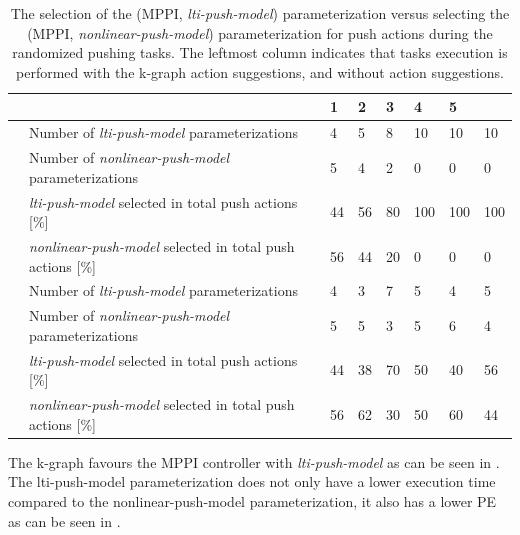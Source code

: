 \begin{table}[H]
    \caption{The selection of the (\ac{MPPI}, \textit{lti-push-model}) parameterization versus selecting the (\ac{MPPI}, \textit{nonlinear-push-model}) parameterization for push actions during the randomized pushing tasks. The leftmost column indicates that tasks execution is performed with the \ac{k-graph} action suggestions, and without action suggestions.}
    \label{table:rand_push_model1_vs_model2}
    \centering
    \begin{tabular}%
      {
        >{\raggedright\arraybackslash}p{}
        >{\raggedright\arraybackslash}p{}
      |p{0.4cm}p{0.4cm}p{0.4cm}p{0.4cm}p{0.4cm}p{0.4cm}}
      \multicolumn{2}{c|}{Number of Tasks in experience} &0&1&2&3&4&5\\\toprule
      \multirow{4}{0.1\textwidth}{With \ac{k-graph} suggestions} 
      &Number of \textit{lti-push-model} parameterizations&4&5&8&10&10&10\\
      &Number of \textit{nonlinear-push-model} parameterizations&5&4&2&0&0&0\\
      & \textit{lti-push-model} selected in total push actions [\%]&44&56&80&100&100&100\\
      & \textit{nonlinear-push-model} selected in total push actions [\%]&56&44&20&0&0&0\\\midrule
      \multirow{4}{0.1\textwidth}{Without \ac{k-graph} suggestions} 
      &Number of \textit{lti-push-model} parameterizations&4&3&7&5&4&5\\
      &Number of \textit{nonlinear-push-model} parameterizations&5&5&3&5&6&4\\
      & \textit{lti-push-model} selected in total push actions [\%]&44&38&70&50&40&56\\
      & \textit{nonlinear-push-model} selected in total push actions [\%]&56&62&30&50&60&44\\
    \end{tabular}
\end{table}


The \ac{k-graph} favours the \ac{MPPI} controller with \textit{lti-push-model} as can be seen in . The lti-push-model parameterization does not only have a lower execution time compared to the nonlinear-push-model parameterization, it also has a lower \ac{PE} as can be seen in .

